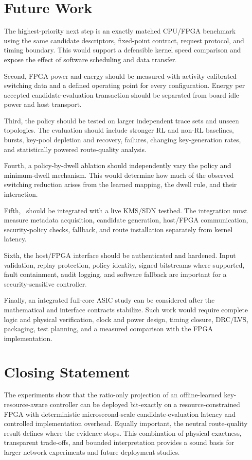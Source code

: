 \section{Future Work}

The highest-priority next step is an exactly matched CPU/FPGA benchmark using the
same candidate descriptors, fixed-point contract, request protocol, and timing
boundary. This would support a defensible kernel speed comparison and expose the
effect of software scheduling and data transfer.

Second, FPGA power and energy should be measured with activity-calibrated switching
data and a defined operating point for every configuration. Energy per accepted
candidate-evaluation transaction should be separated from board idle power and host
transport.

Third, the policy should be tested on larger independent trace sets and unseen
topologies. The evaluation should include stronger RL and non-RL baselines, bursts,
key-pool depletion and recovery, failures, changing key-generation rates, and
statistically powered route-quality analysis.

Fourth, a policy-by-dwell ablation should independently vary the policy and
minimum-dwell mechanism. This would determine how much of the observed switching
reduction arises from the learned mapping, the dwell rule, and their interaction.

Fifth, \QFlow\ should be integrated with a live KMS/SDN testbed. The integration must
measure metadata acquisition, candidate generation, host/FPGA communication,
security-policy checks, fallback, and route installation separately from kernel
latency.

Sixth, the host/FPGA interface should be authenticated and hardened. Input
validation, replay protection, policy identity, signed bitstreams where supported,
fault containment, audit logging, and software fallback are important for a
security-sensitive controller.

Finally, an integrated full-core ASIC study can be considered after the mathematical
and interface contracts stabilize. Such work would require complete logic and
physical verification, clock and power design, timing closure, DRC/LVS, packaging,
test planning, and a measured comparison with the FPGA implementation.

\section{Closing Statement}

The experiments show that the ratio-only projection of an offline-learned
key-resource-aware controller can be deployed bit-exactly on a
resource-constrained FPGA with deterministic
microsecond-scale candidate-evaluation latency and controlled implementation
overhead. Equally important, the neutral route-quality result defines where the
evidence stops. This combination of physical exactness, transparent trade-offs, and
bounded interpretation provides a sound basis for larger network experiments and
future deployment studies.
